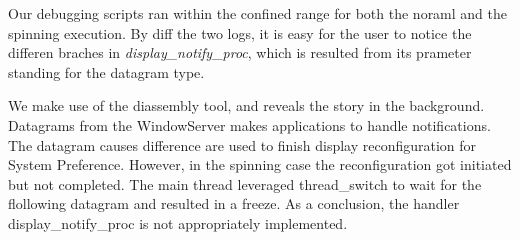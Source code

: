 Our debugging scripts ran within the confined range for both the noraml and the
spinning execution.
By diff the two logs, it is easy for the
user to notice the differen braches in \textit{display\_notify\_proc}, which is
resulted from its prameter standing for the datagram type.

We make use of the diassembly tool, and reveals the story in the background.
Datagrams from the WindowServer makes applications to handle notifications.
The datagram causes difference are used to finish display reconfiguration for
System Preference.  However, in the spinning case the reconfiguration got
initiated but not completed.  The main thread leveraged thread\_switch to wait
for the flollowing datagram and resulted in a freeze.  As a conclusion, the
handler display\_notify\_proc is not appropriately implemented.
